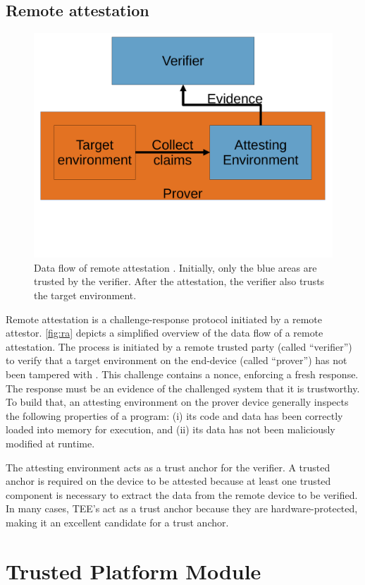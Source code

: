 \subsection{Remote attestation}

\begin{figure}[htpb]
  \centering
  \includegraphics[trim={0 5cm 0 0}, width=0.5\linewidth]{figures/remote_attestation.pdf}
  \caption{Data flow of remote attestation \cite{rfc9334}. Initially, only the blue areas are trusted by the verifier. After the attestation, the verifier also trusts the target environment.} \label{fig:ra}
\end{figure}

Remote attestation is a challenge-response protocol initiated by a remote attestor. \autoref{fig:ra} depicts a simplified overview of the data flow of a remote attestation.
The process is initiated by a remote trusted party (called ``verifier'') to verify that a target environment on the end-device (called ``prover'') has not been tampered with \cite{Menetrey2022, Coker2011}. This challenge contains a nonce, enforcing a fresh response.
The response must be an evidence of the challenged system that it is trustworthy. To build that, an attesting environment on the prover device generally inspects the following properties of a program: (i) its code and data has been correctly loaded into memory for execution, and (ii) its data has not been maliciously modified at runtime.

The attesting environment acts as a trust anchor for the verifier.
A trusted anchor is required on the device to be attested because at least one trusted component is necessary to extract the data from the remote device to be verified. In many cases, TEE's act as a trust anchor because they are hardware-protected, making it an excellent candidate for a trust anchor.

\section{Trusted Platform Module}

